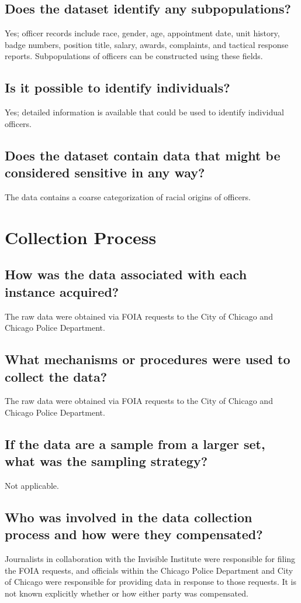 \documentclass[letterpaper, 10 pt, conference]{ieeeconf}  %
\begin{document}
\subsection{Does the dataset identify any subpopulations?}
Yes; officer records include race, gender, age, appointment date, unit history, badge numbers, position title,
salary, awards, complaints, and tactical response reports. Subpopulations of officers can be constructed
using these fields.

\subsection{Is it possible to identify individuals?}
Yes; detailed information is available that could be used to identify individual officers.

\subsection{Does the dataset contain data that might be considered sensitive in any way?}
The data contains a coarse categorization of racial origins of officers.

\section{Collection Process}

\subsection{How was the data associated with each instance acquired?}
The raw data were obtained via FOIA requests to the City of Chicago and Chicago Police Department.

\subsection{What mechanisms or procedures were used to collect the data?}
The raw data were obtained via FOIA requests to the City of Chicago and Chicago Police Department.

\subsection{If the data are a sample from a larger set, what was the sampling strategy?}
Not applicable. 

\subsection{Who was involved in the data collection process and how were they compensated?}
Journalists in collaboration with the Invisible Institute were responsible for filing
the FOIA requests, and officials within the Chicago Police Department and City of Chicago were responsible
for providing data in response to those requests. It is not known explicitly whether or how 
either party was compensated.
\end{document}
